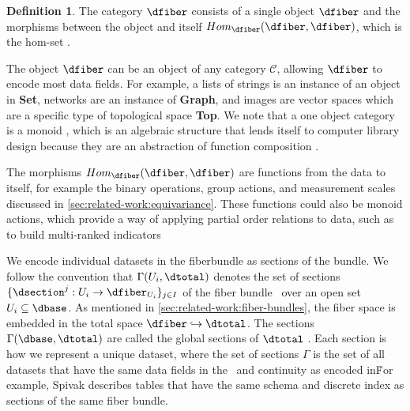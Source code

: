 \documentclass[10pt,journal,compsoc]{IEEEtran}
\theoremstyle{definition}
\newtheorem{definition}{Definition}[section]
\theoremstyle{remark}
\begin{document}
\begin{definition} 
  \label{def:category:F} 
  The category $\mathcal{\dfiber}$ consists of a single object $\dfiber$ and the morphisms between the object and itself $Hom_{\mathcal{\dfiber}}(\dfiber, \dfiber)$, which is the hom-set \cite{maclaneCategoriesWorkingMathematician2013,milewskiCategoryTheoryProgrammers}.
\end{definition}

The object $\texttt{\dfiber}$ can be an object of any category $\mathcal{C}$, allowing $\texttt{\dfiber}$ to encode most data fields. For example, a lists of strings is an instance of an object in \textbf{Set}, networks are an instance of \textbf{Graph}, and images are vector spaces which are a specific type of topological space \textbf{Top}. We note that a one object category is a monoid \cite{nlab:monoid,barrCategoryTheoryComputing}, which is an algebraic structure that lends itself to computer library design because they are an abstraction of function composition \cite{yorgeyMonoidsThemeVariations}. 

The morphisms $Hom_{\mathcal{\dfiber}}(\dfiber, \dfiber)$ are functions from the data to itself, for example the binary operations, group actions, and measurement scales discussed in \autoref{sec:related-work:equivariance}. These functions could also be monoid actions\cite{barrCategoryTheoryComputing}, which provide a way of applying partial order relations to data\cite{fongInvitationAppliedCategory2019}, such as to build multi-ranked indicators\cite{bruggemannRankingPrioritizationMultiindicator2011}

We encode individual datasets in the fiberbundle as sections of the bundle. We follow the convention that $\Gamma(U_i, \dtotal)$ denotes the set of sections $\{\dsection^{j}:U_i \rightarrow \dfiber_{U_{i}}\}_{j\in I}$ of the fiber bundle \dtotal\ over an open set $U_{i}\subseteq \dbase$.  As mentioned in \autoref{sec:related-work:fiber-bundles}, the fiber space is embedded in the total space $\dfiber \hookrightarrow \dtotal$. The sections $\Gamma(\dbase, \dtotal)$ are called the global sections of $\dtotal$ \cite{SheafMathematics2021,spanier1989algebraic}. Each section is how we represent a unique dataset, where the set of sections $\Gamma$ is the set of all datasets that have the same data fields in the \dfiber\ and continuity as encoded in\dbase\. For example, Spivak describes tables that have the same schema and discrete index as sections of the same fiber bundle\cite{spivakSIMPLICIALDATABASES}.
\end{document}
